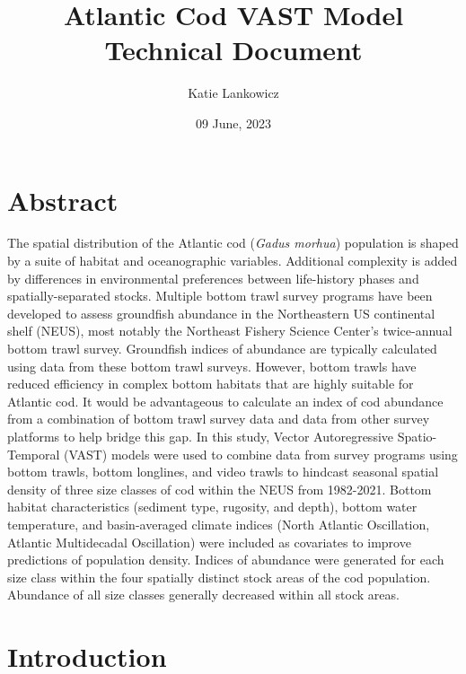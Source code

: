 \documentclass[
]{article}
\title{Atlantic Cod VAST Model Technical Document}
\author{Katie Lankowicz}
\date{09 June, 2023}
\begin{document}
\maketitle

{
\setcounter{tocdepth}{2}
\tableofcontents
}
\hypertarget{abstract}{%
\section{Abstract}\label{abstract}}

The spatial distribution of the Atlantic cod (\emph{Gadus morhua}) population is shaped by a suite of habitat and oceanographic variables. Additional complexity is added by differences in environmental preferences between life-history phases and spatially-separated stocks. Multiple bottom trawl survey programs have been developed to assess groundfish abundance in the Northeastern US continental shelf (NEUS), most notably the Northeast Fishery Science Center's twice-annual bottom trawl survey. Groundfish indices of abundance are typically calculated using data from these bottom trawl surveys. However, bottom trawls have reduced efficiency in complex bottom habitats that are highly suitable for Atlantic cod. It would be advantageous to calculate an index of cod abundance from a combination of bottom trawl survey data and data from other survey platforms to help bridge this gap. In this study, Vector Autoregressive Spatio-Temporal (VAST) models were used to combine data from survey programs using bottom trawls, bottom longlines, and video trawls to hindcast seasonal spatial density of three size classes of cod within the NEUS from 1982-2021. Bottom habitat characteristics (sediment type, rugosity, and depth), bottom water temperature, and basin-averaged climate indices (North Atlantic Oscillation, Atlantic Multidecadal Oscillation) were included as covariates to improve predictions of population density. Indices of abundance were generated for each size class within the four spatially distinct stock areas of the cod population. Abundance of all size classes generally decreased within all stock areas.

\hypertarget{introduction}{%
\section{Introduction}\label{introduction}}
\end{document}
